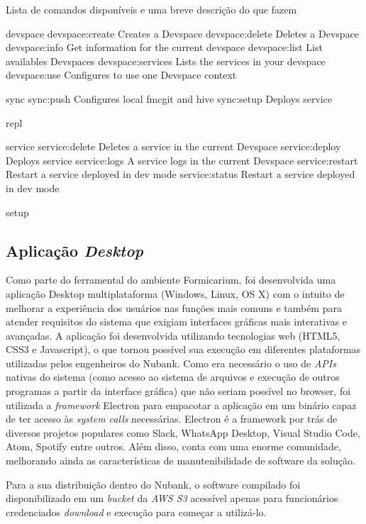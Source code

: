 \documentclass[twosideprint]{politex}
\begin{document}
Lista de comandos disponíveis e uma breve descrição do que fazem

devspace
  devspace:create    Creates a Devspace
  devspace:delete    Deletes a Devspace
  devspace:info      Get information for the current devspace
  devspace:list      List availables Devspaces
  devspace:services  Lists the services in your devspace
  devspace:use       Configures to use one Devspace context
  

sync
  sync:push   Configures local fmcgit and hive
  sync:setup  Deploys service

repl

service
  service:delete   Deletes a service in the current Devspace
  service:deploy   Deploys service
  service:logs     A service logs in the current Devspace
  service:restart  Restart a service deployed in dev mode
  service:status   Restart a service deployed in dev mode
  

setup




    \subsection{Aplicação \textit{Desktop}}

Como parte do ferramental do ambiente Formicarium, foi desenvolvida uma aplicação Desktop multiplataforma (Windows, Linux, OS X) com o intuito de melhorar a experiência dos usuários nas funções mais comuns e também para atender requisitos do sistema que exigiam interfaces gráficas mais interativas e avançadas. A aplicação foi desenvolvida utilizando tecnologias web (HTML5, CSS3 e Javascript), o que tornou possível sua execução em diferentes plataformas utilizadas pelos engenheiros do Nubank. Como era necessário o uso de \textit{APIs} nativas do sistema (como acesso ao sistema de arquivos e execução de outros programas a partir da interface gráfica) que não seriam possível no browser, foi utilizada a \textit{framework} Electron para empacotar a aplicação em um binário capaz de ter acesso às \textit{system calls} necessárias. Electron é a framework por trás de diversos projetos populares como Slack, WhatsApp Desktop, Visual Studio Code, Atom, Spotify entre outros. Além disso, conta com uma enorme comunidade, melhorando ainda as características de manutenibilidade de software da solução.

Para a sua distribuição dentro do Nubank, o software compilado foi disponibilizado em um \textit{bucket} da \textit{AWS S3} acessível apenas para funcionários credenciados \textit{download} e execução para começar a utilizá-lo.
\end{document}
